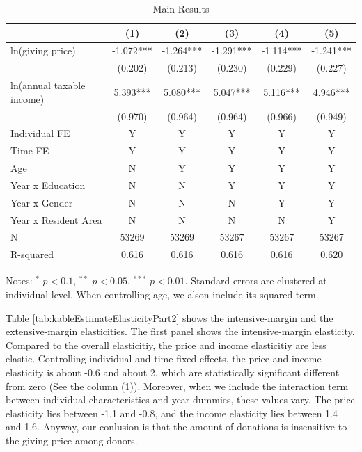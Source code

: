 \documentclass[
  11pt,
  a4paper,
]{article}
\begin{document}
  \begin{table}

  \caption{\label{tab:kableEstimateElasticityPart1}Main Results}
  \centering
  \fontsize{7}{9}\selectfont
  \begin{threeparttable}
  \begin{tabular}[t]{lccccc}
  \toprule
   & (1) & (2) & (3) & (4) & (5)\\
  \midrule
  ln(giving price) & -1.072*** & -1.264*** & -1.291*** & -1.114*** & -1.241***\\
   & (0.202) & (0.213) & (0.230) & (0.229) & (0.227)\\
  ln(annual taxable income) & 5.393*** & 5.080*** & 5.047*** & 5.116*** & 4.946***\\
   & (0.970) & (0.964) & (0.964) & (0.966) & (0.949)\\
  Individual FE & Y & Y & Y & Y & Y\\
  Time FE & Y & Y & Y & Y & Y\\
  Age & N & Y & Y & Y & Y\\
  Year x Education & N & N & Y & Y & Y\\
  Year x Gender & N & N & N & Y & Y\\
  Year x Resident Area & N & N & N & N & Y\\
  N & 53269 & 53269 & 53267 & 53267 & 53267\\
  R-squared & 0.616 & 0.616 & 0.616 & 0.616 & 0.620\\
  \bottomrule
  \end{tabular}
  \begin{tablenotes}
  \item Notes: $^{*}$ $p < 0.1$, $^{**}$ $p < 0.05$, $^{***}$ $p < 0.01$. Standard errors are clustered at individual level. When controlling age, we alson include its squared term.
  \end{tablenotes}
  \end{threeparttable}
  \end{table}

  Table \ref{tab:kableEstimateElasticityPart2} shows the intensive-margin and the extensive-margin elasticities.
  The first panel shows the intensive-margin elasticity.
  Compared to the overall elasticitiy, the price and income elasticitiy are less elastic.
  Controlling individual and time fixed effects,
  the price and income elasticity is about -0.6 and about 2,
  which are statistically significant different from zero (See the column (1)).
  Moreover, when we include the interaction term between individual characteristics and year dummies,
  these values vary.
  The price elasticity lies between -1.1 and -0.8,
  and the income elasticity lies between 1.4 and 1.6.
  Anyway, our conlusion is that the amount of donations is insensitive to the giving price among donors.
\end{document}

